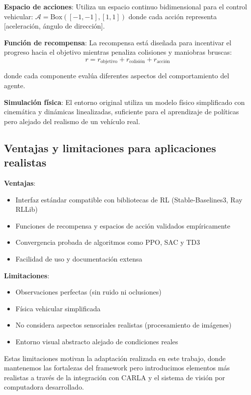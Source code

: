 \textbf{Espacio de acciones}: Utiliza un espacio continuo bidimensional para el control
vehicular: $\mathcal{A} = \text{Box}([-1, -1], [1, 1])$ donde cada acción representa
[aceleración, ángulo de dirección].


\textbf{Función de recompensa}: La recompensa está diseñada para incentivar el progreso
hacia el objetivo mientras penaliza colisiones y maniobras bruscas:
\begin{equation}
    r = r_{\text{objetivo}} + r_{\text{colisión}} + r_{\text{acción}}
\end{equation}

donde cada componente evalúa diferentes aspectos del comportamiento del agente.


\textbf{Simulación física}: El entorno original utiliza un modelo físico simplificado
con cinemática y dinámicas linealizadas, suficiente para el aprendizaje
de políticas pero alejado del realismo de un vehículo real.

\subsection{Ventajas y limitaciones para aplicaciones realistas}

\textbf{Ventajas}:
\begin{itemize}
    \item Interfaz estándar compatible con bibliotecas de RL (Stable-Baselines3, Ray RLLib)
    \item Funciones de recompensa y espacios de acción validados empíricamente
    \item Convergencia probada de algoritmos como PPO, SAC y TD3
    \item Facilidad de uso y documentación extensa
\end{itemize}


\textbf{Limitaciones}:
\begin{itemize}
    \item Observaciones perfectas (sin ruido ni oclusiones)
    \item Física vehicular simplificada
    \item No considera aspectos sensoriales realistas (procesamiento de imágenes)
    \item Entorno visual abstracto alejado de condiciones reales
\end{itemize}


Estas limitaciones motivan la adaptación realizada en este trabajo, donde mantenemos
las fortalezas del framework pero introducimos elementos más realistas a través de
la integración con CARLA y el sistema de visión por computadora desarrollado.
